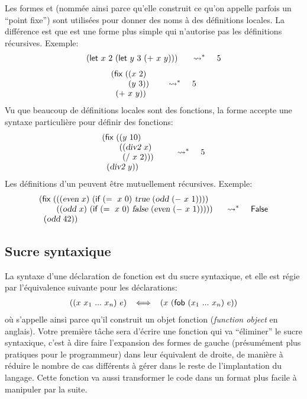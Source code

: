 \documentclass{article}
\begin{document}
Les formes  et  (nommée ainsi parce qu'elle construit ce
qu'on appelle parfois un ``point fixe'') sont utilisées pour donner des noms
à des définitions locales.  La différence est que  est une forme
plus simple qui n'autorise pas les définitions récursives.  Exemple:
\begin{displaymath}
  \Align[c]{(\kw{let}~x~2~(\kw{let}~y~3~(+~x~y)))} \;\;\;\;\leadsto^*\;\;\;\;5
\end{displaymath}
\begin{displaymath}
  \Align[c]{(\kw{fix}~(\Align{(x~2)\\(y~3))} \\\;\; (+~x~y))} \;\;\;\;\leadsto^*\;\;\;\;5
\end{displaymath}
Vu que beaucoup de définitions locales sont des fonctions, la forme 
accepte une syntaxe particulière pour définir des fonctions:
\begin{displaymath}
  \Align[c]{(\kw{fix}~(\Align{(y~10) \\
              (\Align{(\id{div2}~x) \\
                (/~x~2)))}}
            \\\;\;(\id{div2}~y))}
  \;\;\;\;\leadsto^*\;\;\;\;5
\end{displaymath}
Les définitions d'un  peuvent être mutuellement récursives.  Exemple:
\begin{displaymath}
  \Align[c]{
    (\kw{fix}~
    (\Align{
      (\Align{(\id{even}~x)~
        (\kw{if}~(=~x~0)~\id{true}~(\id{odd}~(-~x~1))))} \\
      (\Align{(\id{odd}~x)~
        (\kw{if}~(=~x~0)~\id{false}~(\id{even}~(-~x~1)))))}} \\
    \;\;(\id{odd}~42))}
  \leadsto^*\;\;\;\;\kw{False}
\end{displaymath}

\subsection{Sucre syntaxique}
\label{sec:sucre}

La syntaxe d'une déclaration de fonction est du sucre
syntaxique, et elle est régie par l'équivalence suivante pour les déclarations:
\begin{displaymath}
  \begin{array}{r@{\;\;\;\;\Longleftrightarrow\;\;\;\;}l}
    ((x~x_1~...~x_n)~e) &
        (x~(\kw{fob}~(x_1~...~x_n)~e))
  \end{array}
\end{displaymath}
où  s'appelle ainsi parce qu'il construit un objet fonction
(\emph{function object} en anglais).
Votre première tâche sera d'écrire une fonction  qui va
``éliminer'' le sucre syntaxique, c'est à dire faire l'expansion des formes
de gauche (présumément plus pratiques pour le programmeur) dans leur
équivalent de droite, de manière à réduire le nombre de cas différents
à gérer dans le reste de l'implantation du langage.  Cette fonction va aussi
transformer le code dans un format plus facile à manipuler par la suite.
\end{document}
